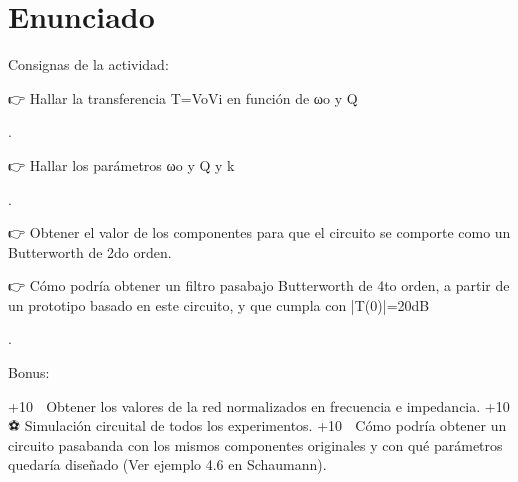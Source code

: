 \documentclass[letterpaper,10pt,english]{sphinxmanual}
\let\sphinxpxdimen\pdfpxdimen\else\newdimen\sphinxpxdimen
\begin{document}
\section{Enunciado}
\label{\detokenize{tp-semanal-2:Enunciado}}
\sphinxAtStartPar
\sphinxincludegraphics[width=1799\sphinxpxdimen,height=872\sphinxpxdimen]{{image5}.png}

\sphinxAtStartPar
Consignas de la actividad:

\sphinxAtStartPar
👉 Hallar la transferencia T=VoVi en función de ωo y Q

\sphinxAtStartPar
.

\sphinxAtStartPar
👉 Hallar los parámetros ωo y Q y k

\sphinxAtStartPar
.

\sphinxAtStartPar
👉 Obtener el valor de los componentes para que el circuito se comporte como un Butterworth de 2do orden.

\sphinxAtStartPar
👉 Cómo podría obtener un filtro pasabajo Butterworth de 4to orden, a partir de un prototipo basado en este circuito, y que cumpla con |T(0)|=20dB

\sphinxAtStartPar
.

\sphinxAtStartPar
Bonus:

\begin{sphinxVerbatim}[commandchars=\\\{\}]
+10 💎 Obtener los valores de la red normalizados en frecuencia e impedancia.
+10  ⚽️ Simulación circuital de todos los experimentos.
+10  🎸 Cómo podría obtener un circuito pasabanda con los mismos componentes originales y con qué parámetros quedaría diseñado (Ver ejemplo 4.6 en Schaumann).
\end{sphinxVerbatim}
\end{document}
